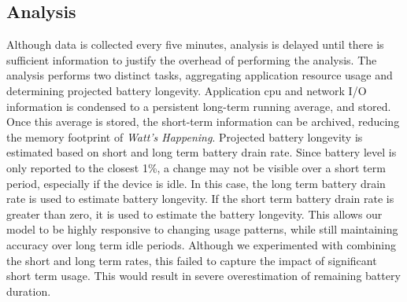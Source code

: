 \subsection*{Analysis}
Although data is collected every five minutes, analysis is delayed until there is sufficient information to justify the overhead of performing the analysis.
The analysis performs two distinct tasks, aggregating application resource usage and determining projected battery longevity.
Application cpu and network I/O information is condensed to a persistent long-term running average, and stored.
Once this average is stored, the short-term information can be archived, reducing the memory footprint of \emph{Watt's Happening}.
Projected battery longevity is estimated based on short and long term battery drain rate.
Since battery level is only reported to the closest 1\%, a change may not be visible over a short term period, especially if the device is idle.
In this case, the long term battery drain rate is used to estimate battery longevity.  
If the short term battery drain rate is greater than zero, it is used to estimate the battery longevity.
This allows our model to be highly responsive to changing usage patterns, while still maintaining accuracy over long term idle periods.
Although we experimented with combining the short and long term rates, this failed to capture the impact of significant short term usage.  
This would result in severe overestimation of remaining battery duration.



